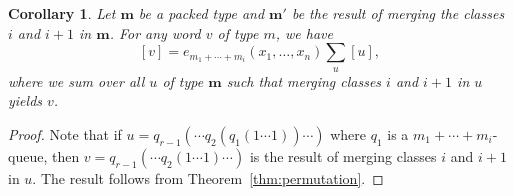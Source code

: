 \documentclass[reqno]{amsart}
\newcommand{\0}{\phantom{c}}
\newcommand{\mm}{\mathbf{m}}
\let\sumnonlimits\sum
\renewcommand{\sum}{\sumnonlimits\limits}
\theoremstyle{plain}
\newtheorem{cor}[thm]{Corollary}
\theoremstyle{definition}
\numberwithin{equation}{section}
\begin{document}
\begin{cor}
\label{co:merge}
  Let $\mm$ be a packed type and $\mm'$ be the result of merging the classes $i$ and $i+1$ in $\mm$. For any word $v$ of type $m$, we have
  \[
  [v] = e_{m_1 + \cdots + m_i}(x_1, \dotsc, x_n) \sum_u [u],
  \]
  where we sum over all $u$ of type $\mm$ such that merging classes $i$ and $i+1$ in $u$ yields $v$.
\end{cor}

\begin{proof}
  Note that if $u = q_{r-1}(\cdots q_2(q_1(1 \dotsm 1)) \cdots)$ where $q_1$ is a $m_1 + \cdots + m_i$-queue, then $v = q_{r-1}(\cdots q_2(1\dotsm 1)\cdots)$ is the result of merging classes $i$ and $i+1$ in $u$. The result follows from Theorem~\ref{thm:permutation}.
\end{proof}
\end{document}

